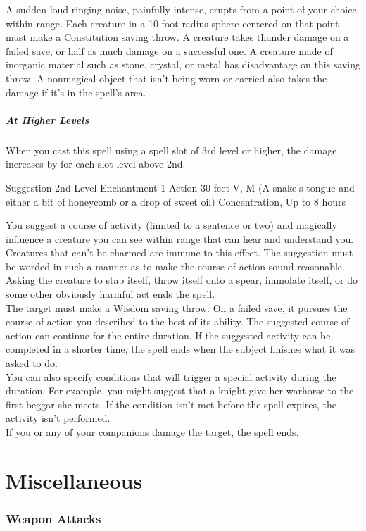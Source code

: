 \documentclass[letterpaper,openany,oneside,twocolumn]{book}
\begin{document}
A sudden loud ringing noise, painfully intense, erupts from a point of your choice within range. Each creature in a 10-foot-radius sphere centered on that point must make a Constitution saving throw. A creature takes  thunder damage on a failed save, or half as much damage on a successful one. A creature made of inorganic material such as stone, crystal, or metal has disadvantage on this saving throw. A nonmagical object that isn’t being worn or carried also takes the damage if it’s in the spell’s area.

\subparagraph*{At Higher Levels} When you cast this spell using a spell slot of 3rd level or higher, the damage increases by  for each slot level above 2nd.

\DndSpellHeader
  {Suggestion}
  {2nd Level Enchantment}
  {1 Action}
  {30 feet}
  {V, M (A snake's tongue and either a bit of honeycomb or a drop of sweet oil)}
  {Concentration, Up to 8 hours}

You suggest a course of activity (limited to a sentence or two) and magically influence a creature you can see within range that can hear and understand you. Creatures that can’t be charmed are immune to this effect. The suggestion must be worded in such a manner as to make the course of action sound reasonable. Asking the creature to stab itself, throw itself onto a spear, immolate itself, or do some other obviously harmful act ends the spell.\\
The target must make a Wisdom saving throw. On a failed save, it pursues the course of action you described to the best of its ability. The suggested course of action can continue for the entire duration. If the suggested activity can be completed in a shorter time, the spell ends when the subject finishes what it was asked to do.\\
You can also specify conditions that will trigger a special activity during the duration. For example, you might suggest that a knight give her warhorse to the first beggar she meets. If the condition isn’t met before the spell expires, the activity isn’t performed.\\
If you or any of your companions damage the target, the spell ends.

\section*{Miscellaneous}
\subsubsection*{Weapon Attacks}
\end{document}
